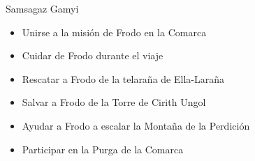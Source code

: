 \documentclass[tfg,estilo=digital,portada=normativa]{fdi-simplex}
\begin{document}
\begin{contribucion}{Samsagaz Gamyi}
\begin{itemize}
\item Unirse a la misión de Frodo en la Comarca
\item Cuidar de Frodo durante el viaje
\item Rescatar a Frodo de la telaraña de Ella-Laraña
\item Salvar a Frodo de la Torre de Cirith Ungol
\item Ayudar a Frodo a escalar la Montaña de la Perdición
\item Participar en la Purga de la Comarca
\end{itemize}
\end{contribucion}

\printbibliography[heading=bibintoc]
\end{document}
